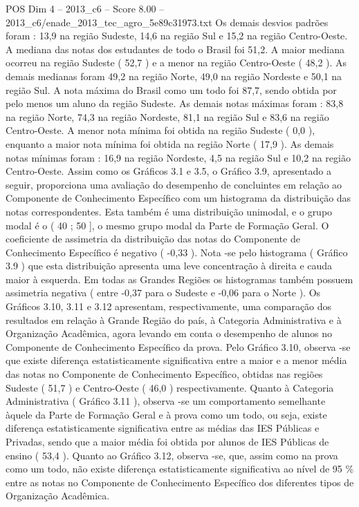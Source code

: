\begin{textsample}{POS Dim 4 – 2013\_c6 – Score 8.00 – 2013\_c6/enade\_2013\_tec\_agro\_5e89c31973.txt}
Os demais desvios padrões foram : 13,9 na região Sudeste, 14,6 na região Sul e 15,2 na região Centro-Oeste.
A mediana das notas dos estudantes de todo o Brasil foi 51,2.
A maior mediana ocorreu na região Sudeste ( 52,7 ) e a menor na região Centro-Oeste ( 48,2 ).
As demais medianas foram 49,2 na região Norte, 49,0 na região Nordeste e 50,1 na região Sul.
A nota máxima do Brasil como um todo foi 87,7, sendo obtida por pelo menos um aluno da região Sudeste.
As demais notas máximas foram : 83,8 na região Norte, 74,3 na região Nordeste, 81,1 na região Sul e 83,6 na região Centro-Oeste.
A menor nota mínima foi obtida na região Sudeste ( 0,0 ), enquanto a maior nota mínima foi obtida na região Norte ( 17,9 ).
As demais notas mínimas foram : 16,9 na região Nordeste, 4,5 na região Sul e 10,2 na região Centro-Oeste.
Assim como os Gráficos 3.1 e 3.5, o Gráfico 3.9, apresentado a seguir, proporciona uma avaliação do desempenho de concluintes em relação ao Componente de Conhecimento Específico com um histograma da distribuição das notas correspondentes.
Esta também é uma distribuição unimodal, e o grupo modal é o ( 40 ; 50 ], o mesmo grupo modal da Parte de Formação Geral.
O coeficiente de assimetria da distribuição das notas do Componente de Conhecimento Específico é negativo ( -0,33 ).
Nota -se pelo histograma ( Gráfico 3.9 ) que esta distribuição apresenta uma leve concentração à direita e cauda maior à esquerda.
Em todas as Grandes Regiões os histogramas também possuem assimetria negativa ( entre -0,37 para o Sudeste e -0,06 para o Norte ).
Os Gráficos 3.10, 3.11 e 3.12 apresentam, respectivamente, uma comparação dos resultados em relação à Grande Região do país, à Categoria Administrativa e à Organização Acadêmica, agora levando em conta o desempenho de alunos no Componente de Conhecimento Específico da prova.
Pelo Gráfico 3.10, observa -se que existe diferença estatisticamente significativa entre a maior e a menor média das notas no Componente de Conhecimento Específico, obtidas nas regiões Sudeste ( 51,7 ) e Centro-Oeste ( 46,0 ) respectivamente.
Quanto à Categoria Administrativa ( Gráfico 3.11 ), observa -se um comportamento semelhante àquele da Parte de Formação Geral e à prova como um todo, ou seja, existe diferença estatisticamente significativa entre as médias das IES Públicas e Privadas, sendo que a maior média foi obtida por alunos de IES Públicas de ensino ( 53,4 ).
Quanto ao Gráfico 3.12, observa -se, que, assim como na prova como um todo, não existe diferença estatisticamente significativa ao nível de 95 \% entre as notas no Componente de Conhecimento Específico dos diferentes tipos de Organização Acadêmica.

\end{textsample}
